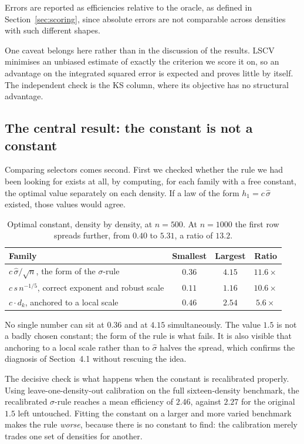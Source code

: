 \documentclass[11pt]{article}
\newcommand{\shat}{\hat{\sigma}}
\begin{document}
Errors are reported as efficiencies relative to the oracle, as defined in
Section~\ref{sec:scoring}, since absolute errors are not comparable across densities with
such different shapes.

One caveat belongs here rather than in the discussion of the results. LSCV minimises an
unbiased estimate of exactly the criterion we score it on, so an advantage on the integrated
squared error is expected and proves little by itself. The independent check is the KS
column, where its objective has no structural advantage.

\subsection{The central result: the constant is not a constant}

Comparing selectors comes second. First we checked whether the rule we had been looking for
exists at all, by computing, for each family with a free constant, the optimal value
separately on each density. If a law of the form $h_1 = c\,\shat$ existed, those values would
agree.

\begin{table}[H]
\centering
\begin{tabular}{@{}lccc@{}}
\toprule
\textbf{Family} & \textbf{Smallest} & \textbf{Largest} & \textbf{Ratio} \\
\midrule
$c\,\shat/\sqrt{n}$, the form of the $\sigma$-rule & $0.36$ & $4.15$ & $11.6\times$ \\
$c\,s\,n^{-1/5}$, correct exponent and robust scale & $0.11$ & $1.16$ & $10.6\times$ \\
$c \cdot d_k$, anchored to a local scale & $0.46$ & $2.54$ & $5.6\times$ \\
\bottomrule
\end{tabular}
\caption{Optimal constant, density by density, at $n = 500$. At $n = 1000$ the first row
spreads further, from $0.40$ to $5.31$, a ratio of $13.2$.}
\label{tab:constants}
\end{table}

No single number can sit at $0.36$ and at $4.15$ simultaneously. The value $1.5$ is not a
badly chosen constant; the form of the rule is what fails. It is also visible that anchoring
to a local scale rather than to $\shat$ halves the spread, which confirms the diagnosis of
Section~4.1 without rescuing the idea.

The decisive check is what happens when the constant is recalibrated properly. Using
leave-one-density-out calibration on the full sixteen-density benchmark, the recalibrated
$\sigma$-rule reaches a mean efficiency of $2.46$, against $2.27$ for the original $1.5$ left
untouched. Fitting the constant on a larger and more varied benchmark makes the rule
\emph{worse}, because there is no constant to find: the calibration merely trades one set of
densities for another.
\end{document}
